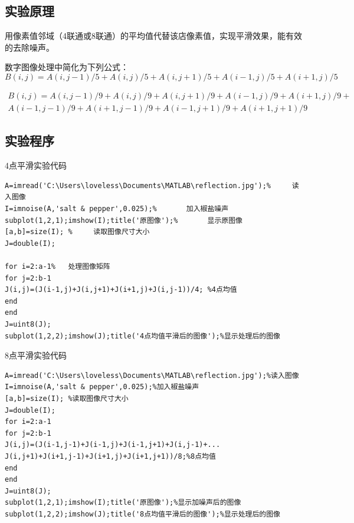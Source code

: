 \documentclass[12pt]{article}
\begin{document}
\subsection{实验原理}
用像素值邻域（4联通或8联通）的平均值代替该店像素值，实现平滑效果，能有效的去除噪声。\par
   数字图像处理中简化为下列公式：
$$B(i,j)=A(i,j-1)/5+A(i,j)/5+A(i,j+1)/5+A(i-1,j)/5+A(i+1,j)/5$$

\[\begin{split}
B(i,j)=A(i,j-1)/9+A(i,j)/9+A(i,j+1)/9+A(i-1,j)/9+A(i+1,j)/9+\\
A(i-1,j-1)/9+A(i+1,j-1)/9+A(i-1,j+1)/9+A(i+1,j+1)/9
\end{split}
\]

\subsection{实验程序}
4点平滑实验代码
\begin{lstlisting}
A=imread('C:\Users\loveless\Documents\MATLAB\reflection.jpg');%     读入图像
I=imnoise(A,'salt & pepper',0.025);%       加入椒盐噪声
subplot(1,2,1);imshow(I);title('原图像');%       显示原图像
[a,b]=size(I); %     读取图像尺寸大小
J=double(I);

for i=2:a-1%   处理图像矩阵
for j=2:b-1
J(i,j)=(J(i-1,j)+J(i,j+1)+J(i+1,j)+J(i,j-1))/4; %4点均值
end
end
J=uint8(J);
subplot(1,2,2);imshow(J);title('4点均值平滑后的图像');%显示处理后的图像
\end{lstlisting}
8点平滑实验代码
\begin{lstlisting}
A=imread('C:\Users\loveless\Documents\MATLAB\reflection.jpg');%读入图像
I=imnoise(A,'salt & pepper',0.025);%加入椒盐噪声
[a,b]=size(I); %读取图像尺寸大小
J=double(I);
for i=2:a-1
for j=2:b-1
J(i,j)=(J(i-1,j-1)+J(i-1,j)+J(i-1,j+1)+J(i,j-1)+...
J(i,j+1)+J(i+1,j-1)+J(i+1,j)+J(i+1,j+1))/8;%8点均值
end
end
J=uint8(J);
subplot(1,2,1);imshow(I);title('原图像');%显示加噪声后的图像
subplot(1,2,2);imshow(J);title('8点均值平滑后的图像');%显示处理后的图像
\end{lstlisting}
\end{document}
